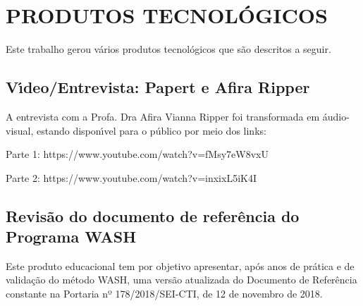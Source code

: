 \documentclass[
12pt,		%
openright,	%
twoside,  %
a4paper,			%
chapter=TITLE,		%
english,			%
french,				%
spanish,			%
brazil				%
]{USPSC-classe/USPSC}
\begin{document}
\chapter[PRODUTOS TECNOL\'OGICOS]{PRODUTOS TECNOL\'OGICOS}\label{PRODUTOS TECNOL\'OGICOS}
Este trabalho gerou v\'arios produtos tecnol\'ogicos que s\~ao descritos a seguir.

















\section[V\'{\i}deo/Entrevista: Papert e Afira Ripper]{V\'{\i}deo/Entrevista: Papert e Afira Ripper}\label{V\'{\i}deo/Entrevista: Papert e Afira Ripper}
A entrevista com a Profa. Dra Afira Vianna Ripper foi transformada em \'audio-visual, estando dispon\'{\i}vel para o p\'ublico por meio dos links:


















\begin{alineas}
\item Parte 1: https://www.youtube.com/watch?v=fMsy7eW8vxU
\item Parte 2: https://www.youtube.com/watch?v=inxixL5iK4I
\end{alineas}

\section[Revis\~ao do documento de refer\^encia do Programa WASH]{Revis\~ao do documento de refer\^encia do Programa WASH}\label{Revis\~ao do documento de refer\^encia do Programa WASH}
Este produto educacional tem por objetivo apresentar, ap\'os anos de pr\'atica e de valida\c{c}\~ao do m\'etodo WASH, uma vers\~ao atualizada do Documento de Refer\^encia constante na Portaria nº 178/2018/SEI-CTI, de 12 de novembro de 2018.
\end{document}
